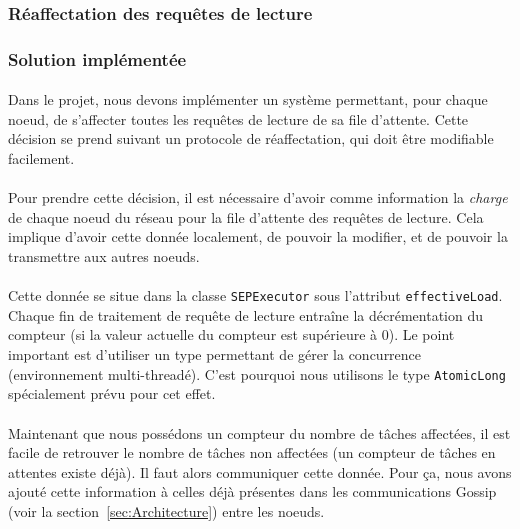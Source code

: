 \documentclass[12pt]{article}
\newcommand{\class}[1]{\texttt{#1}}
\begin{document}
\subsubsection{Réaffectation des requêtes de lecture}

\subsubsection*{Solution implémentée}

\paragraph{}Dans le projet, nous devons implémenter un système permettant, pour chaque noeud, de s'affecter toutes les requêtes de lecture de sa file d'attente. Cette décision se prend suivant un protocole de réaffectation, qui doit être modifiable facilement.

\paragraph{}Pour prendre cette décision, il est nécessaire d'avoir comme information la \textit{charge} de chaque noeud du réseau pour la file d'attente des requêtes de lecture. Cela implique d'avoir cette donnée localement, de pouvoir la modifier, et de pouvoir la transmettre aux autres noeuds.

\paragraph{}Cette donnée se situe dans la classe \class{SEPExecutor} sous l'attribut \texttt{effectiveLoad}. Chaque fin de traitement de requête de lecture entraîne la décrémentation du compteur (si la valeur actuelle du compteur est supérieure à 0). Le point important est d'utiliser un type permettant de gérer la concurrence (environnement multi-threadé). C'est pourquoi nous utilisons le type \class{AtomicLong} spécialement prévu pour cet effet.

\paragraph{}Maintenant que nous possédons un compteur du nombre de tâches affectées, il est facile de retrouver le nombre de tâches non affectées (un compteur de tâches en attentes existe déjà). Il faut alors communiquer cette donnée. Pour ça, nous avons ajouté cette information à celles déjà présentes dans les communications Gossip (voir la section~\ref{sec:Architecture}) entre les noeuds.
\end{document}
